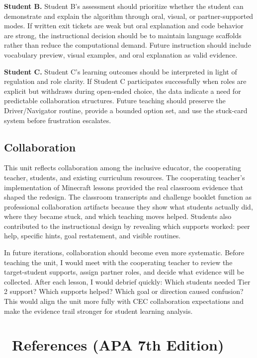 \documentclass[12pt]{article}
\begin{document}
\textbf{Student B.} Student B's assessment should prioritize whether the student can demonstrate and explain the algorithm through oral, visual, or partner-supported modes. If written exit tickets are weak but oral explanation and code behavior are strong, the instructional decision should be to maintain language scaffolds rather than reduce the computational demand. Future instruction should include vocabulary preview, visual examples, and oral explanation as valid evidence.

\textbf{Student C.} Student C's learning outcomes should be interpreted in light of regulation and role clarity. If Student C participates successfully when roles are explicit but withdraws during open-ended choice, the data indicate a need for predictable collaboration structures. Future teaching should preserve the Driver/Navigator routine, provide a bounded option set, and use the stuck-card system before frustration escalates.

\subsection{Collaboration}

This unit reflects collaboration among the inclusive educator, the cooperating teacher, students, and existing curriculum resources. The cooperating teacher's implementation of Minecraft lessons provided the real classroom evidence that shaped the redesign. The classroom transcripts and challenge booklet function as professional collaboration artifacts because they show what students actually did, where they became stuck, and which teaching moves helped. Students also contributed to the instructional design by revealing which supports worked: peer help, specific hints, goal restatement, and visible routines.

In future iterations, collaboration should become even more systematic. Before teaching the unit, I would meet with the cooperating teacher to review the target-student supports, assign partner roles, and decide what evidence will be collected. After each lesson, I would debrief quickly: Which students needed Tier 2 support? Which supports helped? Which goal or direction caused confusion? This would align the unit more fully with CEC collaboration expectations and make the evidence trail stronger for student learning analysis.

\clearpage
\section{\texorpdfstring{\faBook\ References (APA 7th Edition)}{References (APA 7th Edition)}}
\end{document}
